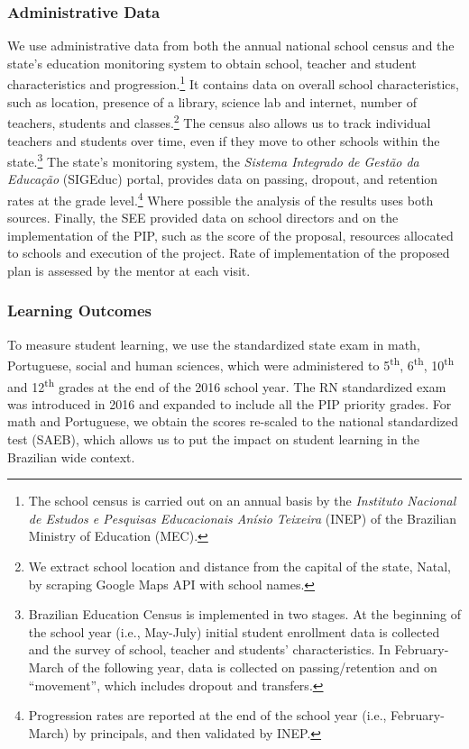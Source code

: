 \documentclass[11pt,a4paper]{article}
\begin{document}
\subsubsection*{Administrative Data} 
We use administrative data from both the annual national school census and the state's education monitoring system to obtain school, teacher and student characteristics and progression.\footnote{The school census is carried out on an annual basis by the \textit{Instituto Nacional de Estudos e Pesquisas Educacionais Anísio Teixeira} (INEP) of the Brazilian Ministry of Education (MEC).} It contains data on overall school characteristics, such as location, presence of a library, science lab and internet, number of teachers, students and classes.\footnote{We extract school location and distance from the capital of the state, Natal, by scraping Google Maps API with school names.} The census also allows us to track individual teachers and students over time, even if they move to other schools within the state.\footnote{Brazilian Education Census is implemented in two stages. At the beginning of the school year (i.e., May-July) initial student enrollment data is collected and the survey of school, teacher and students' characteristics. In February-March of the following year, data is collected on passing/retention and on ``movement'', which includes dropout and transfers.} The state's monitoring system, the \textit{Sistema Integrado de Gestão da Educação} (SIGEduc) portal, provides data on passing, dropout, and retention rates at the grade level.\footnote{Progression rates are reported at the end of the school year (i.e., February-March) by principals, and then validated by INEP.} Where possible the analysis of the results uses both sources. Finally, the SEE provided data on school directors and on the implementation of the PIP, such as the score of the proposal, resources allocated to schools and execution of the project. Rate of implementation of the proposed plan is assessed by the mentor at each visit.  

\subsubsection*{Learning Outcomes}
To measure student learning, we use the standardized state exam in math, Portuguese, social and human sciences, which were administered to 5\textsuperscript{th}, 6\textsuperscript{th}, 10\textsuperscript{th} and 12\textsuperscript{th} grades at the end of the 2016 school year. The RN standardized exam was introduced in 2016 and expanded to include all the PIP priority grades. For math and Portuguese, we obtain the scores re-scaled to the national standardized test (SAEB), which allows us to put the impact on student learning in the Brazilian wide context. %
\end{document}

